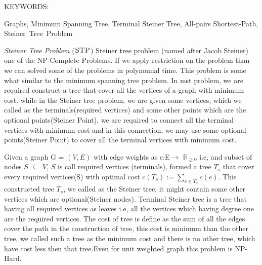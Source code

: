 \abstract

\noindent KEYWORDS: \hspace*{0.5em} \parbox[t]{4.4in}{Graphs, Minimum Spanning Tree, Terminal Steiner Tree, All-pairs Shortest-Path, 
\mbox{Steiner Tree Problem}}

\vspace*{24pt}
\noindent
 \emph{Steiner Tree Problem} ($\textsc{STP}$) Steiner tree problem (named after Jacob Steiner) one of the NP-Complete Problems. If we apply restriction on the problem than we can solved some of the problems in polynomial time. This problem is some what similar to the minimum spanning tree problem. In mst problem, we are required construct a tree that cover all the vertices of a graph with minimum cost. while in the Steiner tree problem, we are given some vertices, which we called as the terminals(required vertices) and some other points which are the optional points(Steiner Point), we are required to connect all the terminal vertices with minimum cost and in this connection, we may use some optional points(Steiner Point) to cover all the terminal vertices with minimum cost.

Given a graph G = $(V,E)$ with edge weights as c:E$\rightarrow$ $\mathbb{R}_{\geq 0}$ i.e, and subset of nodes $S$ $\subseteq$ $V$, $S$ is call required vertices (terminals), formed a tree $T_s$ that cover every required vertices(S) with optimal cost $c(T_s):= \sum_{e\in T_s} c(e)$. This constructed tree $T_s$, we called as the Steiner tree, it might contain some other vertices which are optional(Steiner nodes). Terminal Steiner tree is a tree that having all required vertices as leaves i.e, all the vertices which having degree one are the required vertices. The cost of tree is define as the sum of all the edges cover the path in the construction of tree, this cost is minimum than the other tree, we called such a tree as the minimum cost and there is no other tree, which have cost less then that tree.Even for unit weighted graph this problem is NP-Hard.

\pagebreak
